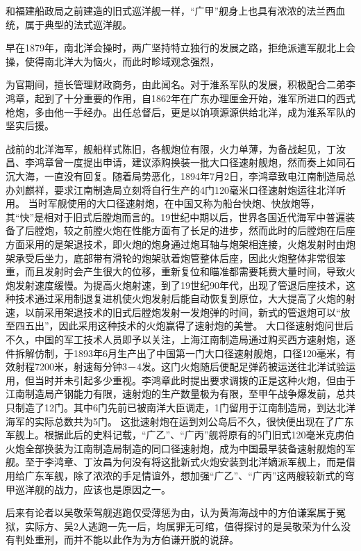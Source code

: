 \documentclass[12pt,UTF8]{ctexbook}
\begin{document}
和福建船政局之前建造的旧式巡洋舰一样，“广甲”舰身上也具有浓浓的法兰西血统，属于典型的法式巡洋舰。

早在1879年，南北洋会操时，两广坚持特立独行的发展之路，拒绝派遣军舰北上会操，使得南北洋大为恼火，而此时畛域观念强烈，

为官期间，擅长管理财政商务，由此闻名。对于淮系军队的发展，积极配合二弟李鸿章，起到了十分重要的作用，自1862年在广东办理厘金开始，淮军所进口的西式枪炮，多由他一手经办。出任总督后，更是以饷项源源供给北洋，成为淮系军队的坚实后援。

战前的北洋海军，舰船样式陈旧，各舰炮位有限，火力单薄，为备战起见，丁汝昌、李鸿章曾一度提出申请，建议添购换装一批大口径速射舰炮，然而奏上如同石沉大海，一直没有回复。随着局势恶化，1894年7月2日，李鸿章致电江南制造局总办刘麒祥，要求江南制造局立刻将自行生产的4门120毫米口径速射炮运往北洋听用。
当时军舰使用的大口径速射炮，在中国又称为船台快炮、快放炮等，其“快”是相对于旧式后膛炮而言的。19世纪中期以后，世界各国近代海军中普遍装备了后膛炮，较之前膛火炮在性能方面有了长足的进步，然而此时的后膛炮在后座方面采用的是架退技术，即火炮的炮身通过炮耳轴与炮架相连接，火炮发射时由炮架承受后坐力，底部带有滑轮的炮架驮着炮管整体后座，因此火炮整体非常很笨重，而且发射时会产生很大的位移，重新复位和瞄准都需要耗费大量时间，导致火炮发射速度缓慢。为提高火炮射速，到了19世纪90年代，出现了管退后座技术，这种技术通过采用制退复进机使火炮发射后能自动恢复到原位，大大提高了火炮的射速，以前采用架退技术的旧式后膛炮发射一发炮弹的时间，新式的管退炮可以“放至四五出”，因此采用这种技术的火炮赢得了速射炮的美誉。
大口径速射炮问世后不久，中国的军工技术人员即予以关注，上海江南制造局通过购买西方速射炮，逐件拆解仿制，于1893年6月生产出了中国第一门大口径速射舰炮，口径120毫米，有效射程7200米，射速每分钟3－4发。这门火炮随后便配足弹药被运送往北洋试验运用，但当时并未引起多少重视。李鸿章此时提出要求调拨的正是这种火炮，但由于江南制造局产钢能力有限，速射炮的生产数量极为有限，至甲午战争爆发前，总共只制造了12门。其中6门先前已被南洋大臣调走，1门留用于江南制造局，到达北洋海军的实际总数共为5门。
这批速射炮在运到刘公岛后不久，很快便出现在了广东军舰上。根据此后的史料记载，“广乙”、“广丙”舰将原有的5门旧式120毫米克虏伯火炮全部换装为江南制造局制造的同口径速射炮，成为中国最早装备速射舰炮的军舰。至于李鸿章、丁汝昌为何没有将这批新式火炮安装到北洋嫡派军舰上，而是借用给广东军舰，除了浓浓的手足情谊外，想加强“广乙”、“广丙”这两艘较新式的穹甲巡洋舰的战力，应该也是原因之一。

后来有论者以吴敬荣驾舰逃跑仅受薄惩为由，认为黄海海战中的方伯谦案属于冤狱，实际方、吴2人逃跑一先一后，均属罪无可绾，值得探讨的是吴敬荣为什么没有判处重刑，而并不能以此作为为方伯谦开脱的说辞。
\end{document}
